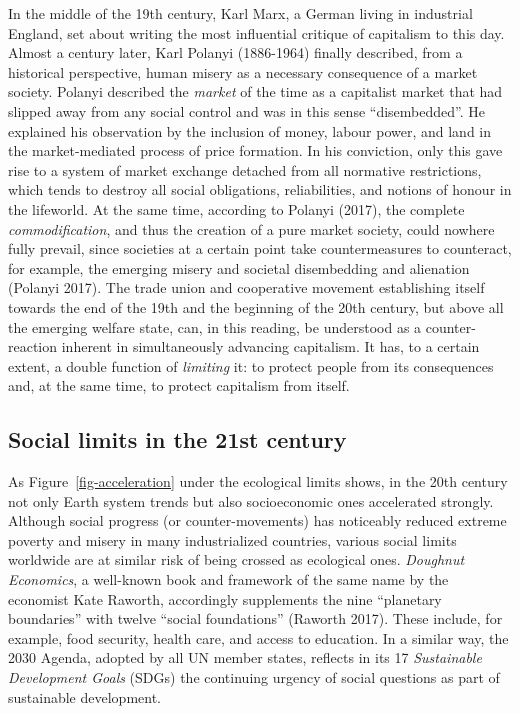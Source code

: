 \documentclass[
  british,
  a4paper,
  DIV=11,
  numbers=noendperiod,
  oneside,
  openany]{scrreprt}
\begin{document}
In the middle of the 19th century, Karl Marx, a German living in
industrial England, set about writing the most influential critique of
capitalism to this day. Almost a century later, Karl Polanyi (1886-1964)
finally described, from a historical perspective, human misery as a
necessary consequence of a market society. Polanyi described the
\emph{market} of the time as a capitalist market that had slipped away
from any social control and was in this sense ``disembedded''. He
explained his observation by the inclusion of money, labour power, and
land in the market-mediated process of price formation. In his
conviction, only this gave rise to a system of market exchange detached
from all normative restrictions, which tends to destroy all social
obligations, reliabilities, and notions of honour in the lifeworld. At
the same time, according to Polanyi (2017), the complete
\emph{commodification}, and thus the creation of a pure market society,
could nowhere fully prevail, since societies at a certain point take
countermeasures to counteract, for example, the emerging misery and
societal disembedding and alienation (Polanyi 2017). The trade union and
cooperative movement establishing itself towards the end of the 19th and
the beginning of the 20th century, but above all the emerging welfare
state, can, in this reading, be understood as a counter-reaction
inherent in simultaneously advancing capitalism. It has, to a certain
extent, a double function of \emph{limiting} it: to protect people from
its consequences and, at the same time, to protect capitalism from
itself.

\subsection{Social limits in the 21st
century}\label{social-limits-in-the-21st-century}

As Figure~\ref{fig-acceleration} under the ecological limits shows, in
the 20th century not only Earth system trends but also socioeconomic
ones accelerated strongly. Although social progress (or
counter-movements) has noticeably reduced extreme poverty and misery in
many industrialized countries, various social limits worldwide are at
similar risk of being crossed as ecological ones. \emph{Doughnut
Economics}, a well-known book and framework of the same name by the
economist Kate Raworth, accordingly supplements the nine ``planetary
boundaries'' with twelve ``social foundations'' (Raworth 2017). These
include, for example, food security, health care, and access to
education. In a similar way, the 2030 Agenda, adopted by all UN member
states, reflects in its 17 \emph{Sustainable Development Goals} (SDGs)
the continuing urgency of social questions as part of sustainable
development.
\end{document}

